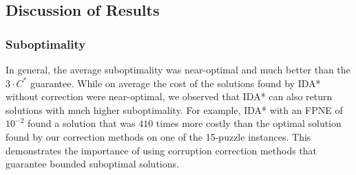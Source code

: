 \documentclass[letterpaper]{article}
\begin{document}
\subsection{Discussion of Results}




\subsubsection{Suboptimality}
In general, the average suboptimality was near-optimal and much better than the $3\cdot C^*$ guarantee. While on average the cost of the solutions found by IDA* without correction were near-optimal, we observed that IDA* can also return solutions with much higher suboptimality. For example, IDA* with an FPNE of $10^{-2}$ found a solution that was $410$ times more costly than %
the optimal solution found by our correction methods
on one of the 15-puzzle instances.
This demonstrates the importance of using corruption correction methods that guarantee bounded suboptimal solutions.
\end{document}
